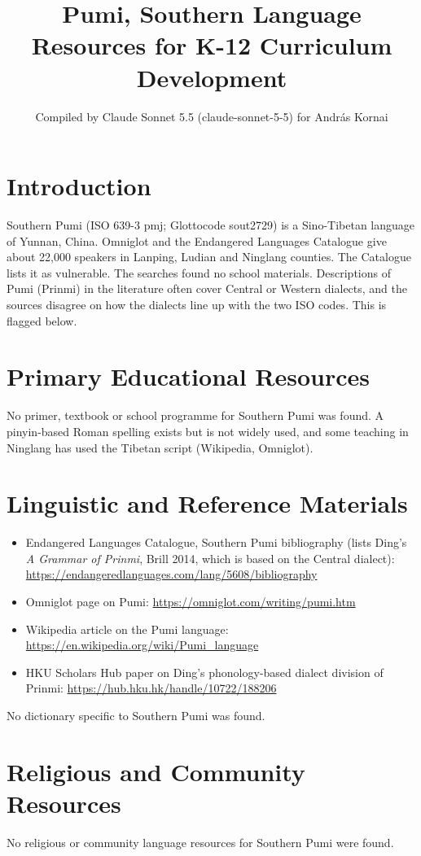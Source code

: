 \documentclass[12pt]{article}
\title{Pumi, Southern Language Resources for K-12 Curriculum Development}
\author{Compiled by Claude Sonnet 5.5 (claude-sonnet-5-5) for Andr\'as Kornai}
\date{}
\begin{document}
\maketitle

\section{Introduction}
Southern Pumi (ISO 639-3 pmj; Glottocode sout2729) is a Sino-Tibetan language of Yunnan, China. Omniglot and the Endangered Languages Catalogue give about 22,000 speakers in Lanping, Ludian and Ninglang counties. The Catalogue lists it as vulnerable. The searches found no school materials. Descriptions of Pumi (Prinmi) in the literature often cover Central or Western dialects, and the sources disagree on how the dialects line up with the two ISO codes. This is flagged below.

\section{Primary Educational Resources}
No primer, textbook or school programme for Southern Pumi was found. A pinyin-based Roman spelling exists but is not widely used, and some teaching in Ninglang has used the Tibetan script (Wikipedia, Omniglot).

\section{Linguistic and Reference Materials}
\begin{itemize}
\item Endangered Languages Catalogue, Southern Pumi bibliography (lists Ding's \emph{A Grammar of Prinmi}, Brill 2014, which is based on the Central dialect): \url{https://endangeredlanguages.com/lang/5608/bibliography}
\item Omniglot page on Pumi: \url{https://omniglot.com/writing/pumi.htm}
\item Wikipedia article on the Pumi language: \url{https://en.wikipedia.org/wiki/Pumi_language}
\item HKU Scholars Hub paper on Ding's phonology-based dialect division of Prinmi: \url{https://hub.hku.hk/handle/10722/188206}
\end{itemize}
No dictionary specific to Southern Pumi was found.

\section{Religious and Community Resources}
No religious or community language resources for Southern Pumi were found.
\end{document}
